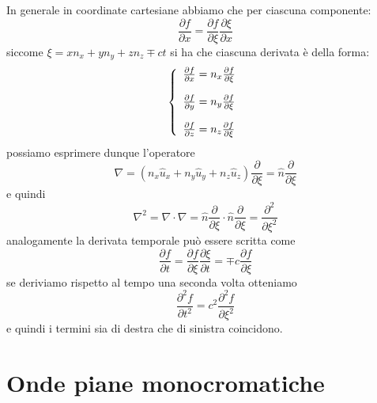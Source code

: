 In generale in coordinate cartesiane abbiamo che per ciascuna componente:
\begin{equation*}
	\frac{\partial f}{\partial x} = \frac{\partial f}{\partial \xi} \frac{\partial \xi}{\partial x}
\end{equation*}
siccome $\xi = xn_{x} + yn_{y} + zn_{z} \mp ct $ si ha che ciascuna derivata \`e della forma:
\begin{equation*}
	\left \{ \begin{array}{l}
		\frac{\partial f}{\partial x} = n_{x} \frac{\partial f}{\partial \xi} \\ \rule{0pt}{20pt}
		\frac{\partial f}{\partial y} = n_{y} \frac{\partial f}{\partial \xi} \\ \rule{0pt}{20pt}
		\frac{\partial f}{\partial z} = n_{z} \frac{\partial f}{\partial \xi}
	\end{array}\right.
\end{equation*}
possiamo esprimere dunque l'operatore
\begin{equation*}
	\nabla = (n_{x} \hat{u}_{x} + n_{y} \hat{u}_{y} + n_{z} \hat{u}_{z}) \frac{\partial }{\partial \xi} = \hat{n} \frac{\partial }{\partial \xi} 
\end{equation*}
e quindi
\begin{equation*}
	\nabla^2 = \nabla \cdot \nabla = \hat{n} \frac{\partial }{\partial \xi} \cdot \hat{n} \frac{\partial }{\partial \xi} = \frac{\partial^2}{\partial \xi^2}
\end{equation*}
analogamente la derivata temporale pu\`o essere scritta come
\begin{equation*}
	\frac{\partial f}{\partial t} = \frac{\partial f }{\partial \xi} \frac{\partial \xi}{\partial t} = \mp c \frac{\partial f}{\partial \xi}
\end{equation*}
se deriviamo rispetto al tempo una seconda volta otteniamo
\begin{equation*}
	\frac{\partial^2 f }{\partial t^2} = c^2 \frac{\partial ^2f}{\partial \xi ^2}
\end{equation*}
e quindi i termini sia di destra che di sinistra coincidono.

\section{Onde piane monocromatiche}



